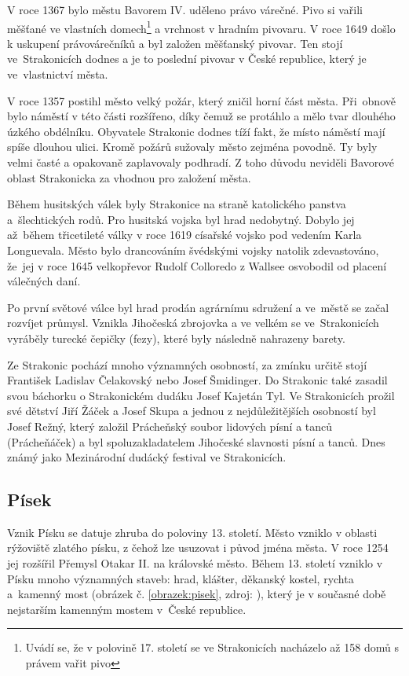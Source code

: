\documentclass[thesis=M,czech]{FITthesis}[2012/06/26]
\begin{document}
V roce 1367 bylo městu Bavorem IV. uděleno právo várečné. Pivo si vařili měšťané ve vlastních domech\footnote{Uvádí se, že v polovině 17. století se ve Strakonicích nacházelo až 158 domů s právem vařit pivo} a vrchnost v hradním pivovaru. V roce 1649 došlo k uskupení právovárečníků a byl založen měšťanský pivovar. Ten stojí ve~Strakonicích dodnes a je to poslední pivovar v České republice, který je ve~vlastnictví města. 

V roce 1357 postihl město velký požár, který zničil horní část města. Při~obnově bylo náměstí v této části rozšířeno, díky čemuž se protáhlo a mělo tvar dlouhého úzkého obdélníku. Obyvatele Strakonic dodnes tíží fakt, že místo náměstí mají spíše dlouhou ulici. Kromě požárů sužovaly město zejména povodně. Ty byly velmi časté a opakovaně zaplavovaly podhradí. Z toho důvodu neviděli Bavorové oblast Strakonicka za vhodnou pro založení města.

Během husitských válek byly Strakonice na straně katolického panstva a~šlechtických rodů. Pro husitská vojska byl hrad nedobytný. Dobylo jej až~během třicetileté války v roce 1619 císařské vojsko pod vedením Karla Longuevala. Město bylo drancováním švédskými vojsky natolik zdevastováno, že~jej v roce 1645 velkopřevor Rudolf Colloredo z Wallsee osvobodil od placení válečných daní.

Po první světové válce byl hrad prodán agrárnímu sdružení a ve~městě se začal rozvíjet průmysl. Vznikla Jihočeská zbrojovka a ve velkém se ve~Strakonicích vyráběly turecké čepičky (fezy), které byly následně nahrazeny barety. 

Ze Strakonic pochází mnoho významných osobností, za zmínku určitě stojí František Ladislav Čelakovský nebo Josef Šmidinger. Do Strakonic také zasadil svou báchorku o Strakonickém dudáku Josef Kajetán Tyl. Ve Strakonicích prožil své dětství Jiří Žáček a Josef Skupa a jednou z nejdůležitějších osobností byl Josef Režný, který založil Prácheňský soubor lidových písní a tanců (Prácheňáček) a byl spoluzakladatelem Jihočeské slavnosti písní a tanců. Dnes známý jako Mezinárodní dudácký festival ve Strakonicích. \cite{obce}


\subsection{Písek}
Vznik Písku se datuje zhruba do poloviny 13. století. Město vzniklo v oblasti rýžoviště zlatého písku, z čehož lze usuzovat i původ jména města. V roce 1254 jej rozšířil Přemysl Otakar II. na královské město. Během 13. století vzniklo v Písku mnoho významných staveb: hrad, klášter, děkanský kostel, rychta a~kamenný most (obrázek č. \ref{obrazek:pisek}, zdroj: \cite{pisek}), který je v současné době nejstarším kamenným mostem v~České republice. 
\end{document}
